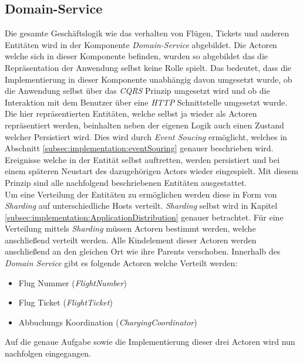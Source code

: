 \subsection{Domain-Service}
\label{subsec:implementation:domainService} 
Die gesamte Geschäftslogik wie das verhalten von Flügen, Tickets und anderen Entitäten wird in der Komponente \textit{Domain-Service}  abgebildet. Die Actoren welche sich in dieser Komponente befinden, wurden so abgebildet das die Repräsentation der Anwendung selbst keine Rolle spielt. Das bedeutet, dass die Implementierung in dieser Komponente unabhängig davon umgesetzt wurde, ob die Anwendung selbst über das \textit{CQRS} Prinzip umgesetzt wird und ob die Interaktion mit dem Benutzer über eine \textit{HTTP} Schnittstelle umgesetzt wurde. \\
Die hier repräsentierten Entitäten, welche selbst ja wieder als Actoren repräsentiert werden, beinhalten neben der eigenen Logik auch einen Zustand welcher Persistiert wird. Dies wird durch \textit{Event Soucing} ermöglicht, welches in Abschnitt \ref{subsec:implementation:eventSouring} genauer beschrieben wird. Ereignisse welche in der Entität selbst auftretten, werden persistiert und bei einem späteren Neustart des dazugehörigen Actors wieder eingespielt. Mit diesem Prinzip sind alle nachfolgend beschriebenen Entitäten ausgestattet. \\
Um eine Verteilung der Entitäten zu ermöglichen werden diese in Form von \textit{Sharding} auf unterschiedliche Hosts verteilt. \textit{Sharding} selbst wird in Kapitel \ref{subsec:implementation:ApplicationDistribution} genauer betrachtet. Für eine Verteilung mittels \textit{Sharding} müssen Actoren bestimmt werden, welche anschließend verteilt werden. Alle Kindelement dieser Actoren werden anschließend an den gleichen Ort wie ihre Parents verschoben. Innerhalb des \textit{Domain Service} gibt es folgende Actoren welche Verteilt werden:
\begin{itemize}
    \item Flug Nummer (\textit{FlightNumber})
    \item Flug Ticket (\textit{FlightTicket})
    \item Abbuchungs Koordination (\textit{ChargingCoordinator})
\end{itemize}
Auf die genaue Aufgabe sowie die Implementierung dieser drei Actoren wird nun nachfolgen eingegangen.

